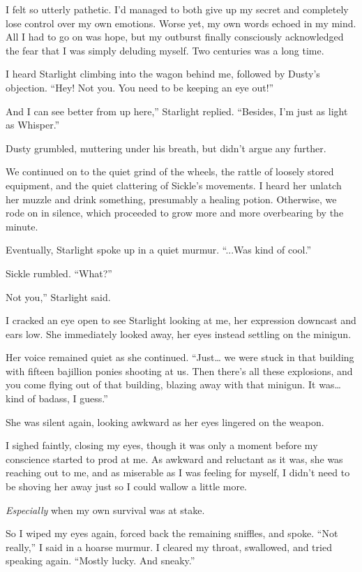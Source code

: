 I felt so utterly pathetic. I’d managed to both give up my secret and completely lose control over my own emotions. Worse yet, my own words echoed in my mind. All I had to go on was hope, but my outburst finally consciously acknowledged the fear that I was simply deluding myself. Two centuries was a long time.

I heard Starlight climbing into the wagon behind me, followed by Dusty’s objection. “Hey! Not you. You need to be keeping an eye out!”

\leavevmode{}And I can see better from up here,” Starlight replied. “Besides, I’m just as light as Whisper.”

Dusty grumbled, muttering under his breath, but didn’t argue any further.

We continued on to the quiet grind of the wheels, the rattle of loosely stored equipment, and the quiet clattering of Sickle’s movements. I heard her unlatch her muzzle and drink something, presumably a healing potion. Otherwise, we rode on in silence, which proceeded to grow more and more overbearing by the minute.

Eventually, Starlight spoke up in a quiet murmur. “...Was kind of cool.”

Sickle rumbled. “What?”

\leavevmode{}Not you,” Starlight said.

I cracked an eye open to see Starlight looking at me, her expression downcast and ears low. She immediately looked away, her eyes instead settling on the minigun.

Her voice remained quiet as she continued. “Just… we were stuck in that building with fifteen bajillion ponies shooting at us. Then there’s all these explosions, and you come flying out of that building, blazing away with that minigun. It was… kind of badass, I guess.”

She was silent again, looking awkward as her eyes lingered on the weapon.

I sighed faintly, closing my eyes, though it was only a moment before my conscience started to prod at me. As awkward and reluctant as it was, she was reaching out to me, and as miserable as I was feeling for myself, I didn’t need to be shoving her away just so I could wallow a little more.

\textit{Especially} when my own survival was at stake.

So I wiped my eyes again, forced back the remaining sniffles, and spoke. “Not really,” I said in a hoarse murmur. I cleared my throat, swallowed, and tried speaking again. “Mostly lucky. And sneaky.”

